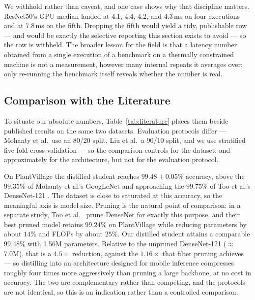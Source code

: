 \documentclass[conference]{IEEEtran}
\begin{document}
We withhold rather than caveat, and one case shows why that discipline matters.
ResNet50's GPU median landed at $4.1$, $4.4$, $4.2$, and $4.3$\,ms on four
executions and at $7.8$\,ms on the fifth. Dropping the fifth would yield a tidy,
publishable row --- and would be exactly the selective reporting this section
exists to avoid --- so the row is withheld. The broader lesson for the field is
that a latency number obtained from a single execution of a benchmark on a
thermally constrained machine is not a measurement, however many internal repeats
it averages over; only re-running the benchmark itself reveals whether the number
is real.

\subsection{Comparison with the Literature}
\label{sec:literature}

To situate our absolute numbers, Table~\ref{tab:literature} places them beside
published results on the same two datasets. Evaluation protocols differ ---
Mohanty et al.\ use an 80/20 split, Liu et al.\ a 90/10 split, and we use
stratified five-fold cross-validation --- so the comparison controls for the
dataset, and approximately for the architecture, but not for the evaluation
protocol.

On PlantVillage the distilled student reaches $99.48\pm0.05\%$ accuracy, above
the $99.35\%$ of Mohanty et al.'s GoogLeNet \cite{mohanty2016using} and
approaching the $99.75\%$ of Too et al.'s DenseNet-121 \cite{too2019comparative}.
The
dataset is close to saturated at this accuracy, so the meaningful axis is model
size. Pruning is the natural point of comparison: in a separate study, Too et
al.\ \cite{too2019pruned} prune DenseNet for exactly this purpose, and their best
pruned model retains $99.24\%$ on PlantVillage while reducing parameters by about
$14\%$ and FLOPs by about $25\%$. Our distilled student attains a comparable
$99.48\%$ with 1.56M parameters. Relative to the unpruned DenseNet-121
($\approx$7.0M), that is a $4.5\times$ reduction, against the $1.16\times$ that
filter pruning achieves --- so distilling into an architecture designed for
mobile inference compresses roughly four times more aggressively than pruning a
large backbone, at no cost in accuracy. The two are complementary rather than
competing, and the protocols are not identical, so this is an indication rather
than a controlled comparison.
\end{document}
